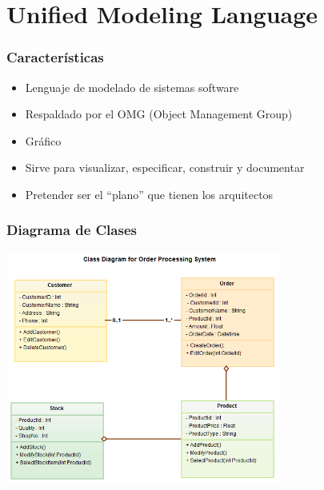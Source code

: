 %
%

\section{Unified Modeling Language}

\begin{frame}
\frametitle{Características}

\begin{itemize}
  \item Lenguaje de modelado de sistemas software
  \item Respaldado por el OMG (Object Management Group)
  \item Gráfico
  \item Sirve para visualizar, especificar, construir y documentar
  \item Pretender ser el ``plano'' que tienen los arquitectos
\end{itemize}

\end{frame}


\begin{frame}
\frametitle{Diagrama de Clases}

\begin{center}
\includegraphics[width=9cm]{figs/UML-Class-Diagram-Example.png}
\end{center}
  
\end{frame}

